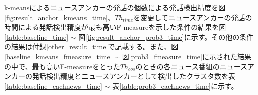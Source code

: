 \vspace{0.2in}\par
k-meansによるニュースアンカーの発話の個数による発話検出精度を図\ref{fig:result_anchor_kmeans_time}、$Th_{time}$を変更してニュースアンカーの発話の時間による発話検出精度が最も高いF-measureを示した条件の結果を図\ref{table:baseline_time} $\sim$ 図\ref{fig:result_anchor_prob3_time}に示す。その他の条件の結果は付録\ref{other_result_time}で記載する。また、図\ref{baseline_kmeans_fmeasure_time} $\sim$ 図\ref{prob3_fmeasure_time}に示された結果の中で、最も高いF-measureをとった$Th_{cos}$のときの各ニュース番組のニュースアンカーの発話検出精度とニュースアンカーとして検出したクラスタ数を表\ref{table:baseline_eachnews_time} $\sim$ 表\ref{table:prob3_eachnews_time}に示す。

